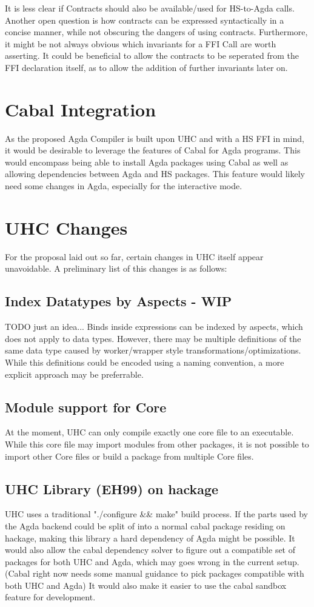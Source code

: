 \documentclass[12pt, a4paper, twoside]{report}
\begin{document}
It is less clear if Contracts should also be available/used for HS-to-Agda calls. Another open question is how
contracts can be expressed syntactically in a concise manner, while not obscuring the dangers of using contracts.
Furthermore, it might be not always obvious which invariants for a FFI Call are worth asserting. It could be beneficial
to allow the contracts to be seperated from the FFI declaration itself, as to allow the addition of further invariants later on.


\section{Cabal Integration}
As the proposed Agda Compiler is built upon UHC and with a HS FFI in mind, it would be desirable
to leverage the features of Cabal for Agda programs. This would encompass being able
to install Agda packages using Cabal as well as allowing dependencies between Agda and HS packages.
This feature would likely need some changes in Agda, especially
for the interactive mode.

\section{UHC Changes}
For the proposal laid out so far, certain changes in UHC itself appear
unavoidable. A preliminary list of this changes is as follows:

\subsection{Index Datatypes by Aspects - WIP}
TODO just an idea...
Binds inside expressions can be indexed by aspects, which does
not apply to data types. However, there may be multiple definitions
of the same data type caused by worker/wrapper style transformations/optimizations.
While this definitions could be encoded using a naming convention, a more explicit
approach may be preferrable.

\subsection{Module support for Core}
At the moment, UHC can only compile exactly one core file to an executable.
While this core file may import modules from other packages, it is not possible
to import other Core files or build a package from multiple Core files.

\subsection{UHC Library (EH99) on hackage}
UHC uses a traditional "./configure \&\& make" build process. If the parts used by the
Agda backend could be split of into a normal cabal package residing on hackage,
making this library a hard dependency of Agda might be possible.
It would also allow the cabal dependency solver to figure out a compatible
set of packages for both UHC and Agda, which may goes wrong in the current setup.
(Cabal right now needs some manual guidance to pick packages compatible with both UHC and Agda)
It would also make it easier to use the cabal sandbox feature for development.
\end{document}
